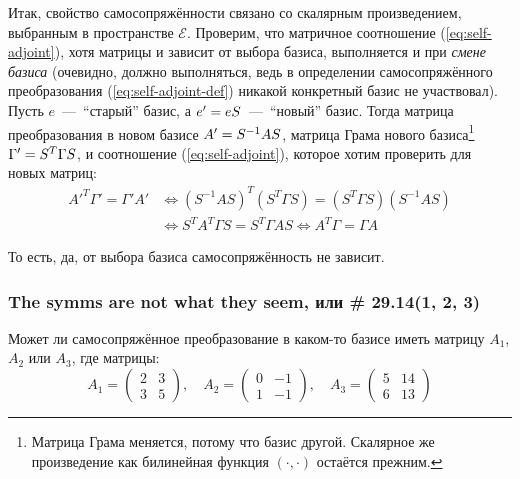 \documentclass[a4paper,12pt]{article}
\theoremstyle{remark}
\begin{document}
  \medskip
  
  Итак, свойство самосопряжённости связано со скалярным произведением, выбранным в пространстве $\mathcal E$.
  Проверим, что матричное соотношение (\ref{eq:self-adjoint}), хотя матрицы и зависит от выбора базиса, выполняется и при \emph{смене базиса} (очевидно, должно выполняться, ведь в определении самосопряжённого преобразования (\ref{eq:self-adjoint-def}) никакой конкретный базис не участвовал).
  Пусть $e$~---~``старый'' базис, а $e' \hm= e S$~---~``новый'' базис.
  Тогда матрица преобразования в новом базисе $A' \hm= S^{-1} A S$, матрица Грама нового базиса\footnote{Матрица Грама меняется, потому что базис другой. Скалярное же произведение как билинейная функция $(\cdot, \cdot)$ остаётся прежним.} $\Gamma' \hm= S^T \Gamma S$, и соотношение (\ref{eq:self-adjoint}), которое хотим проверить для новых матриц:
  \begin{equation*}
  \begin{split}
    A'^T \Gamma' = \Gamma' A'
    &\Leftrightarrow (S^{-1} A S)^T (S^T \Gamma S) = (S^T \Gamma S) (S^{-1} A S)\\
    &\Leftrightarrow S^T A^T \Gamma S = S^T \Gamma A S
    \Leftrightarrow A^T \Gamma = \Gamma A
  \end{split}
  \end{equation*}
  
  То есть, да, от выбора базиса самосопряжённость не зависит.
  
  
  
  \subsubsection{The symms are not what they seem, или \# 29.14(1, 2, 3)}
  
  Может ли самосопряжённое преобразование в каком-то базисе иметь матрицу $A_1$, $A_2$ или $A_3$, где матрицы:
  \[
    A_1 = \begin{pmatrix}
      2 & 3\\
      3 & 5
    \end{pmatrix},\quad
    A_2 = \begin{pmatrix}
      0 & -1\\
      1 & -1
    \end{pmatrix},\quad
    A_3 = \begin{pmatrix}
      5 & 14\\
      6 & 13
    \end{pmatrix}
  \]
  
\end{document}
